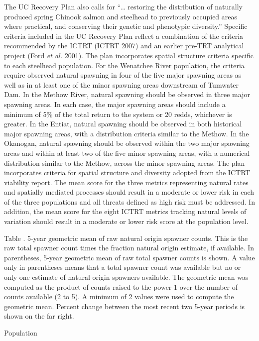 \documentclass[
  letterpaper,
  oneside,
  open=any]{scrbook}
\begin{document}
The UC Recovery Plan also calls for ``\ldots{} restoring the
distribution of naturally produced spring Chinook salmon and steelhead
to previously occupied areas where practical, and conserving their
genetic and phenotypic diversity.'' Specific criteria included in the UC
Recovery Plan reflect a combination of the criteria recommended by the
ICTRT (ICTRT 2007) and an earlier pre-TRT analytical project (Ford
\emph{et al.} 2001). The plan incorporates spatial structure criteria
specific to each steelhead population. For the Wenatchee River
population, the criteria require observed natural spawning in four of
the five major spawning areas as well as in at least one of the minor
spawning areas downstream of Tumwater Dam. In the Methow River, natural
spawning should be observed in three major spawning areas. In each case,
the major spawning areas should include a minimum of 5\% of the total
return to the system or 20 redds, whichever is greater. In the Entiat,
natural spawning should be observed in both historical major spawning
areas, with a distribution criteria similar to the Methow. In the
Okanogan, natural spawning should be observed within the two major
spawning areas and within at least two of the five minor spawning areas,
with a numerical distribution similar to the Methow, across the minor
spawning areas. The plan incorporates criteria for spatial structure and
diversity adopted from the ICTRT viability report. The mean score for
the three metrics representing natural rates and spatially mediated
processes should result in a moderate or lower risk in each of the three
populations and all threats defined as high risk must be addressed. In
addition, the mean score for the eight ICTRT metrics tracking natural
levels of variation should result in a moderate or lower risk score at
the population level.

Table . 5-year geometric mean of raw natural origin spawner counts. This
is the raw total spawner count times the fraction natural origin
estimate, if available. In parentheses, 5-year geometric mean of raw
total spawner counts is shown. A value only in parentheses means that a
total spawner count was available but no or only one estimate of natural
origin spawners available. The geometric mean was computed as the
product of counts raised to the power 1 over the number of counts
available (2 to 5). A minimum of 2 values were used to compute the
geometric mean. Percent change between the most recent two 5-year
periods is shown on the far right.

Population
\end{document}
